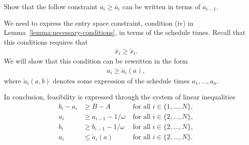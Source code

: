 \documentclass[a4paper]{article}
\theoremstyle{definition}
\theoremstyle{plain}
\begin{document}
{\color{Navy} Show that the follow constraint $a_{i} \geq \bar{a}_{i}$ can be written in terms of $a_{i-1}$.}

We need to express the entry space constraint, condition (iv) in
Lemma~\ref{lemma:necessary-conditions}, in terms of the schedule times. Recall
that this conditions requires that
\begin{align}
  \bar{x}_{i} \geq \check{x}_{i} .
\end{align}
We will show that this condition can be rewritten in the form
\begin{align}
  a_{i} \geq \check{a}_{i}(a) ,
\end{align}
where $\check{a}_{i}(a,b)$ denotes some expression of the schedule times
$a_{1}, \dots, a_{n}$.

In conclusion, feasibility is expressed through the system of linear
inequalities
\begin{subequations}
\begin{align}
  b_{i} - a_{i} &\geq B - A &\text{ for all } i \in \{1, \dots, N\}, \\
  a_{i} &\geq  a_{i-1} - 1/\omega &\text{ for all } i \in \{2, \dots, N\} , \\
  b_{i} &\geq  b_{i-1} - 1/\omega &\text{ for all } i \in \{2, \dots, N\} , \\
  a_{i} &\leq \check{a}_{i}(a) &\text{ for all } i \in \{2, \dots, N \} .
\end{align}
\end{subequations}
\end{document}
